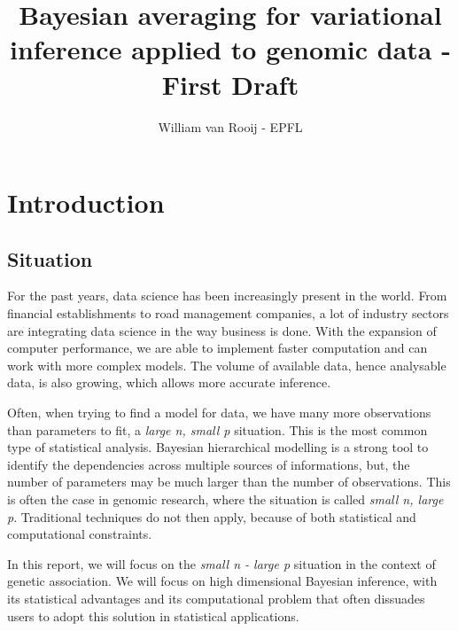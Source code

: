 \documentclass[a4paper, 11pt]{report}
\numberwithin{equation}{chapter}
\begin{document}
\SetEndCharOfAlgoLine{}

\title{Bayesian averaging for variational inference applied to genomic data - First Draft}
\author{William van Rooij - EPFL}

\maketitle

\newpage
\tableofcontents
\newpage
\chapter{Introduction}
\section{Situation}
For the past years, data science has been increasingly present in the world. From financial establishments to road management companies, a lot of industry sectors are integrating data science in the way business is done. With the expansion of computer performance, we are able to implement faster computation and can work with more complex models. The volume of available data, hence analysable data, is also growing, which allows more accurate inference.

Often, when trying to find a model for data, we have many more observations than parameters to fit, a \textit{large n, small p} situation. This is the most common type of statistical analysis. Bayesian hierarchical modelling is a strong tool to identify the dependencies across multiple sources of informations, but, the number of parameters may be much larger than the number of observations. This is often the case in genomic research, where the situation is called \textit{small n, large p}. Traditional techniques do not then apply, because of both statistical and computational constraints.

In this report, we will focus on the \textit{small n - large p} situation in the context of genetic association. We will focus on high dimensional Bayesian inference, with its statistical advantages and its computational problem that often dissuades users to adopt this solution in statistical applications.
\end{document}
